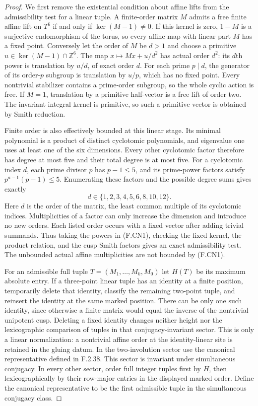 \begin{proof}
We first remove the existential condition about affine lifts
from the admissibility test for a linear tuple. A finite-order
matrix $M$ admits a free finite affine lift on $T^6$ if and
only if $\ker(M-1)\ne0$. If this kernel is zero, $1-M$ is a
surjective endomorphism of the torus, so every affine map with
linear part $M$ has a fixed point. Conversely let the order of
$M$ be $d>1$ and choose a primitive $u\in\ker(M-1)\cap\mathbb Z^6$.
The map $x\mapsto Mx+u/d^2$ has actual order $d^2$: its
$d$th power is translation by $u/d$, of exact order $d$.
For each prime $p\mid d$, the generator of its order-$p$
subgroup is translation by $u/p$, which has no fixed point.
Every nontrivial stabilizer contains a prime-order subgroup,
so the whole cyclic action is free. If $M=1$, translation
by a primitive half-vector is a free lift of order two.
The invariant integral kernel is primitive, so such a
primitive vector is obtained by Smith reduction.

Finite order is also effectively bounded at this linear
stage. Its minimal polynomial is a product of distinct
cyclotomic polynomials, and eigenvalue one uses at least one
of the six dimensions. Every other cyclotomic factor therefore
has degree at most five and their total degree is at most
five. For a cyclotomic index $d$, each prime divisor $p$ has
$p-1\le5$, and its prime-power factors satisfy
$p^{a-1}(p-1)\le5$. Enumerating these factors and the possible
degree sums gives exactly
\[
                 d\in\{1,2,3,4,5,6,8,10,12\}.             \tag{F.CN1}
\]
Here $d$ is the order of the matrix, the least common multiple
of its cyclotomic indices. Multiplicities of a factor can only
increase the dimension and introduce no new orders. Each
listed order occurs with a fixed vector after adding trivial
summands. Thus taking the powers in (F.CN1), checking the
fixed kernel, the product relation, and the cusp Smith
factors gives an exact admissibility test. The unbounded
actual affine multiplicities are not bounded by (F.CN1).

For an admissible full tuple $T=(M_1,\ldots,M_k,M_0)$ let
$H(T)$ be its maximum absolute entry. If a three-point linear
tuple has an identity at a finite position, temporarily delete
that identity, classify the remaining two-point tuple, and
reinsert the identity at the same marked position. There can
be only one such identity, since otherwise a finite matrix
would equal the inverse of the nontrivial unipotent cusp.
Deleting a fixed identity changes neither height nor the
lexicographic comparison of tuples in that conjugacy-invariant
sector. This is only a linear normalization: a nontrivial
affine order at the identity-linear site is retained in the
gluing datum. In the two-involution sector use the canonical
representative defined in F.2.38. This sector is invariant under simultaneous
conjugacy. In every other sector, order full integer tuples
first by $H$, then lexicographically by their row-major
entries in the displayed marked order. Define the canonical
representative to be the first admissible tuple in the
simultaneous conjugacy class.


\end{proof}
